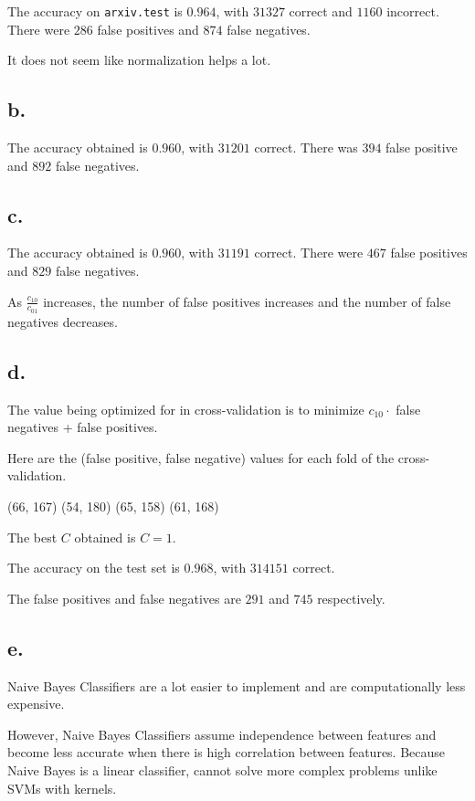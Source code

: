 \documentclass[]{article}
\begin{document}
The accuracy on \texttt{arxiv.test} is $0.964$, with $31327$ correct and $1160$ incorrect. There were $286$ false positives and $874$ false negatives.

It does not seem like normalization helps a lot.

\subsection*{b.}

The accuracy obtained is $0.960$, with $31201$ correct. There was $394$ false positive and $892$ false negatives.

\subsection*{c.}

The accuracy obtained is $0.960$, with $31191$ correct. There were $467$ false positives and $829$ false negatives.

As $\frac{c_{10}}{c_{01}}$ increases, the number of false positives increases and the number of false negatives decreases.

\subsection*{d.}
The value being optimized for in cross-validation is to minimize $c_{10} \cdot$ false negatives + false positives.

Here are the (false positive, false negative) values for each fold of the cross-validation.

(66, 167)
(54, 180)
(65, 158)
(61, 168)

The best $C$ obtained is $C=1$.

The accuracy on the test set is $0.968$, with $314151$ correct.

The false positives and false negatives are $291$ and $745$ respectively.

\subsection*{e.}
Naive Bayes Classifiers are a lot easier to implement and are computationally less expensive.

However, Naive Bayes Classifiers assume independence between features and become less accurate when there is high correlation between features. Because Naive Bayes is a linear classifier, cannot solve more complex problems unlike SVMs with kernels.
\end{document}
